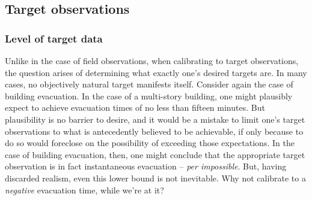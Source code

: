 \documentclass{article}
\begin{document}
\subsection{Target observations}


\subsubsection{Level of target data}\label{level_of_desired_data}
Unlike in the case of field observations, when calibrating to target observations, the question arises of determining what exactly one's desired targets are. In many cases, no objectively natural target manifests itself. Consider again the case of building evacuation. In the case of a multi-story building, one might plausibly expect to achieve evacuation times of no less than fifteen minutes. But plausibility is no barrier to desire, and it would be a mistake to limit one's target observations to what is antecedently believed to be achievable, if only because to do so would foreclose on the possibility of exceeding those expectations. In the case of building evacuation, then, one might conclude that the appropriate target observation is in fact instantaneous evacuation -- \textit{per impossible}. But, having discarded realism, even this lower bound is not inevitable. Why not calibrate to a \emph{negative} evacuation time, while we're at it?
\end{document}
